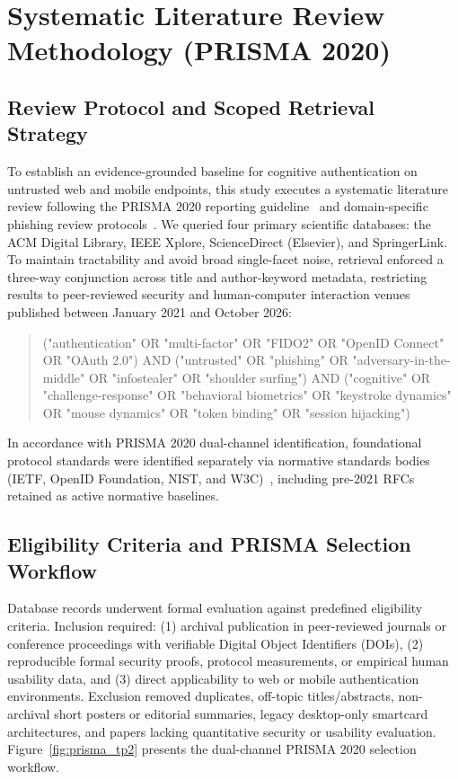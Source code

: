\section{Systematic Literature Review Methodology (PRISMA 2020)}
\label{sec:methodology_and_prisma}

\subsection{Review Protocol and Scoped Retrieval Strategy}
To establish an evidence-grounded baseline for cognitive authentication on untrusted web and mobile endpoints, this study executes a systematic literature review following the PRISMA 2020 reporting guideline~\cite{page2021prisma} and domain-specific phishing review protocols~\cite{naqvi2023mitigation}. We queried four primary scientific databases: the ACM Digital Library, IEEE Xplore, ScienceDirect (Elsevier), and SpringerLink. To maintain tractability and avoid broad single-facet noise, retrieval enforced a three-way conjunction across title and author-keyword metadata, restricting results to peer-reviewed security and human-computer interaction venues published between January 2021 and October 2026:

\begin{quote}\raggedright\footnotesize\ttfamily
("authentication" OR "multi-factor" OR "FIDO2" OR "OpenID Connect" OR "OAuth 2.0") AND ("untrusted" OR "phishing" OR "adversary-in-the-middle" OR "infostealer" OR "shoulder surfing") AND ("cognitive" OR "challenge-response" OR "behavioral biometrics" OR "keystroke dynamics" OR "mouse dynamics" OR "token binding" OR "session hijacking")
\end{quote}

In accordance with PRISMA 2020 dual-channel identification, foundational protocol standards were identified separately via normative standards bodies (IETF, OpenID Foundation, NIST, and W3C)~\cite{oidc_core1, nist80063b4, rfc6238totp, rfc6749oauth, rfc7636pkce, rfc8176amr, rfc9449dpop, rfc9700bcp, w3cwebauthn3}, including pre-2021 RFCs retained as active normative baselines.

\subsection{Eligibility Criteria and PRISMA Selection Workflow}
Database records underwent formal evaluation against predefined eligibility criteria. Inclusion required: (1) archival publication in peer-reviewed journals or conference proceedings with verifiable Digital Object Identifiers (DOIs), (2) reproducible formal security proofs, protocol measurements, or empirical human usability data, and (3) direct applicability to web or mobile authentication environments. Exclusion removed duplicates, off-topic titles/abstracts, non-archival short posters or editorial summaries, legacy desktop-only smartcard architectures, and papers lacking quantitative security or usability evaluation. Figure~\ref{fig:prisma_tp2} presents the dual-channel PRISMA 2020 selection workflow.

